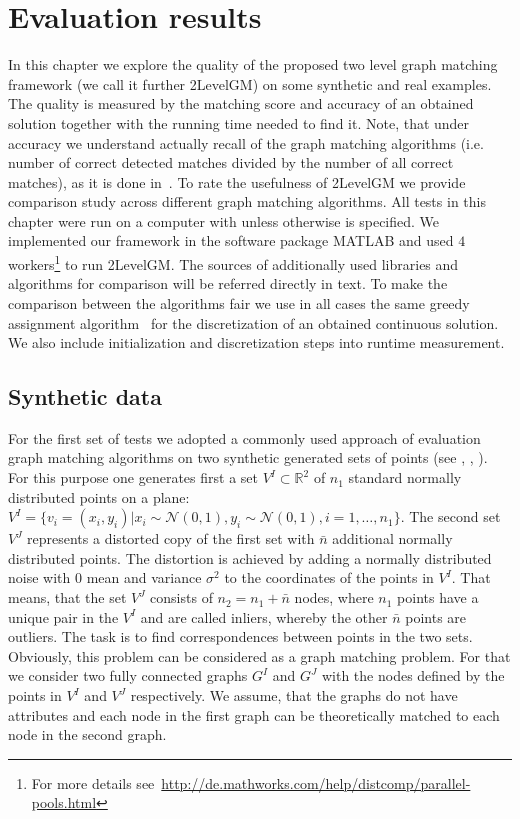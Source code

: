 \chapter{Evaluation results} \label{chapter:results}

In this chapter we explore the quality of the proposed two level graph matching framework (we call it further 2LevelGM) on some synthetic and real examples. The quality is measured by the matching score and accuracy of an obtained solution together with the running time needed to find it. Note, that under accuracy we understand actually recall of the graph matching algorithms (i.e. number of correct detected matches divided by the number of all correct matches), as it is done in~\cite{Cho2014_Haystack,Cho2010_RRWM,Cho2012_ProgressiveGM,Duchenne2011,Rangarajan1996_GAGM,Leordeanu2005_SM,Leordeanu2009_IPFP}.
To rate the usefulness of 2LevelGM we provide comparison study across different graph matching algorithms. All tests in this chapter were run on a computer with  unless otherwise is specified. We implemented our framework in the software package MATLAB and used $4$ workers\footnote{For more details see~\url{http://de.mathworks.com/help/distcomp/parallel-pools.html}} to run 2LevelGM. The sources of additionally used libraries and algorithms for comparison will be referred directly in text. To make the comparison between the algorithms fair we use in all cases the same greedy assignment algorithm~\cite{Leordeanu2005_SM} for the discretization of an obtained continuous solution. We also include initialization and discretization steps into runtime measurement.

\section{Synthetic data}
For the first set of tests we adopted a commonly used approach of evaluation graph matching algorithms on two synthetic generated sets of points (see \cite{Cho2014_Haystack}, \cite{Cho2010_RRWM}, \cite{Leordeanu2009_IPFP}). 
For this purpose one generates first a set $V^I\subset\mathbb{R}^2$ of $n_1$ standard normally distributed points on a plane: $V^I=\{v_i=(x_i,y_i)|x_i\sim\mathcal{N}(0,1),y_i\sim\mathcal{N}(0,1),i=1,\dots,n_1\}$. The second set $V^J$ represents a distorted copy of the first set with $\bar{n}$ additional normally distributed points. The distortion is achieved by adding a normally distributed noise with $0$ mean and variance $\sigma^2$ to the coordinates of the points in $V^I$. That means, that the set $V^J$ consists of $n_2=n_1+\bar{n}$ nodes, where $n_1$ points have a unique pair in the $V^I$ and are called inliers, whereby the other $\bar{n}$ points are outliers. The task is to find correspondences between points in the two sets.
Obviously, this problem can be considered as a graph matching problem. For that we consider two fully connected graphs $G^I$ and $G^J$ with the nodes defined by the points in $V^I$ and $V^J$ respectively. We assume, that the graphs do not have attributes and each node in the first graph can be theoretically matched to each node in the second graph.

